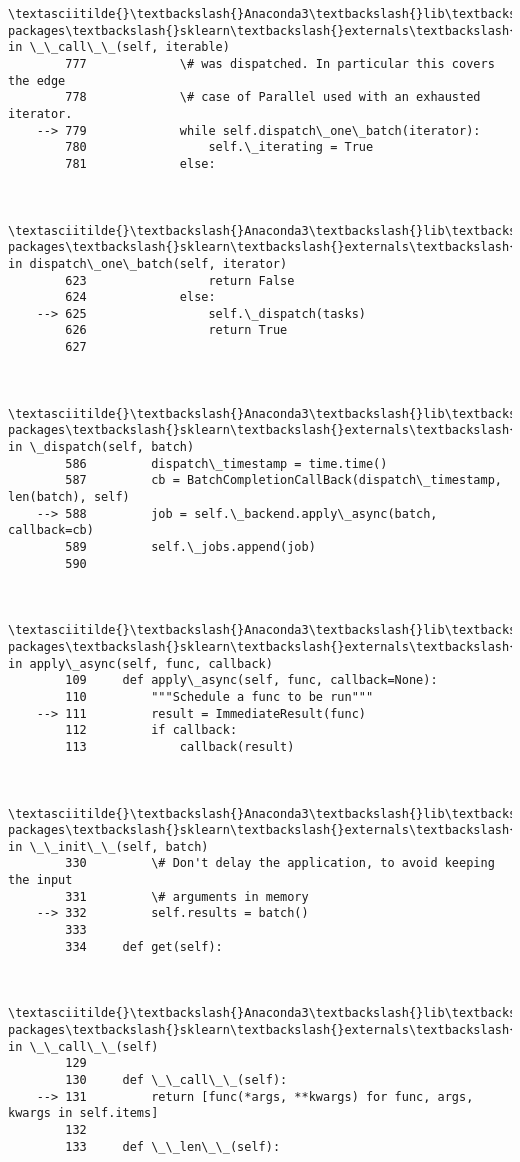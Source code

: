\documentclass[11pt]{article}
\begin{document}
\begin{Verbatim}[commandchars=\\\{\}]
        \textasciitilde{}\textbackslash{}Anaconda3\textbackslash{}lib\textbackslash{}site-packages\textbackslash{}sklearn\textbackslash{}externals\textbackslash{}joblib\textbackslash{}parallel.py in \_\_call\_\_(self, iterable)
        777             \# was dispatched. In particular this covers the edge
        778             \# case of Parallel used with an exhausted iterator.
    --> 779             while self.dispatch\_one\_batch(iterator):
        780                 self.\_iterating = True
        781             else:
    

        \textasciitilde{}\textbackslash{}Anaconda3\textbackslash{}lib\textbackslash{}site-packages\textbackslash{}sklearn\textbackslash{}externals\textbackslash{}joblib\textbackslash{}parallel.py in dispatch\_one\_batch(self, iterator)
        623                 return False
        624             else:
    --> 625                 self.\_dispatch(tasks)
        626                 return True
        627 
    

        \textasciitilde{}\textbackslash{}Anaconda3\textbackslash{}lib\textbackslash{}site-packages\textbackslash{}sklearn\textbackslash{}externals\textbackslash{}joblib\textbackslash{}parallel.py in \_dispatch(self, batch)
        586         dispatch\_timestamp = time.time()
        587         cb = BatchCompletionCallBack(dispatch\_timestamp, len(batch), self)
    --> 588         job = self.\_backend.apply\_async(batch, callback=cb)
        589         self.\_jobs.append(job)
        590 
    

        \textasciitilde{}\textbackslash{}Anaconda3\textbackslash{}lib\textbackslash{}site-packages\textbackslash{}sklearn\textbackslash{}externals\textbackslash{}joblib\textbackslash{}\_parallel\_backends.py in apply\_async(self, func, callback)
        109     def apply\_async(self, func, callback=None):
        110         """Schedule a func to be run"""
    --> 111         result = ImmediateResult(func)
        112         if callback:
        113             callback(result)
    

        \textasciitilde{}\textbackslash{}Anaconda3\textbackslash{}lib\textbackslash{}site-packages\textbackslash{}sklearn\textbackslash{}externals\textbackslash{}joblib\textbackslash{}\_parallel\_backends.py in \_\_init\_\_(self, batch)
        330         \# Don't delay the application, to avoid keeping the input
        331         \# arguments in memory
    --> 332         self.results = batch()
        333 
        334     def get(self):
    

        \textasciitilde{}\textbackslash{}Anaconda3\textbackslash{}lib\textbackslash{}site-packages\textbackslash{}sklearn\textbackslash{}externals\textbackslash{}joblib\textbackslash{}parallel.py in \_\_call\_\_(self)
        129 
        130     def \_\_call\_\_(self):
    --> 131         return [func(*args, **kwargs) for func, args, kwargs in self.items]
        132 
        133     def \_\_len\_\_(self):
    


\end{Verbatim}
\end{document}
